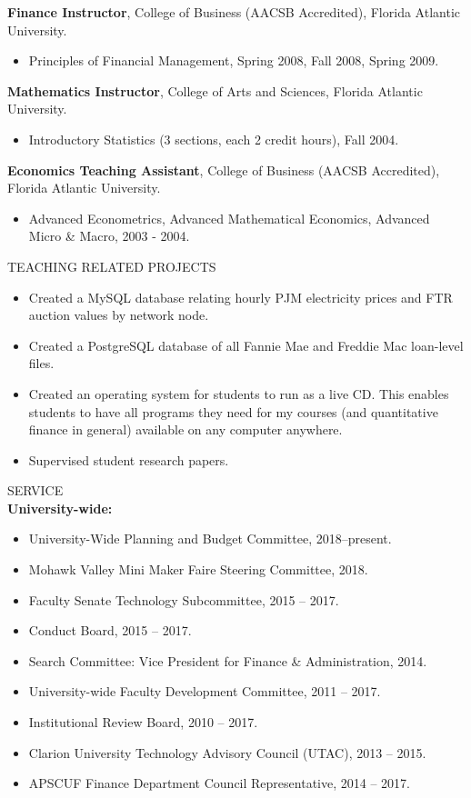 \documentclass[9pt]{article}
\begin{document}
{\bf Finance Instructor}, College of Business (AACSB Accredited), Florida Atlantic University.
\begin{itemize}[noitemsep, nolistsep]
\item Principles of Financial Management, Spring 2008, Fall 2008, Spring 2009.
\end{itemize}
{\bf Mathematics Instructor}, College of Arts and Sciences, Florida Atlantic University.
\begin{itemize}[noitemsep, nolistsep]
\item Introductory Statistics (3 sections, each 2 credit hours), Fall 2004.
\end{itemize}
{\bf Economics Teaching Assistant}, College of Business (AACSB Accredited), Florida Atlantic University.
\begin{itemize}[noitemsep, nolistsep]
\item Advanced Econometrics, Advanced Mathematical Economics, Advanced Micro \& Macro, 2003 - 2004.
\end{itemize}
\vspace{10pt}
TEACHING RELATED PROJECTS
\begin{itemize}[noitemsep, nolistsep]
\item Created a MySQL database relating hourly PJM electricity prices and FTR auction values by network node.
\item Created a PostgreSQL database of all Fannie Mae and Freddie Mac loan-level files.
\item Created an operating system for students to run as a live CD. This enables students to have all programs they need for my courses (and quantitative finance in general) available on any computer anywhere.
\item Supervised student research papers.
\end{itemize}
\vspace{10pt}
SERVICE \\
{\bf University-wide:}
\begin{itemize}[noitemsep, nolistsep]
\item University-Wide Planning and Budget Committee, 2018--present.
\item Mohawk Valley Mini Maker Faire Steering Committee, 2018.
\item Faculty Senate Technology Subcommittee, 2015 -- 2017.
\item Conduct Board, 2015 -- 2017.
\item Search Committee: Vice President for Finance \& Administration, 2014.
\item University-wide Faculty Development Committee, 2011 -- 2017.
\item Institutional Review Board, 2010 -- 2017. 
\item Clarion University Technology Advisory Council (UTAC), 2013 -- 2015. 
\item APSCUF Finance Department Council Representative, 2014 -- 2017. 
\end{itemize}
\end{document}
